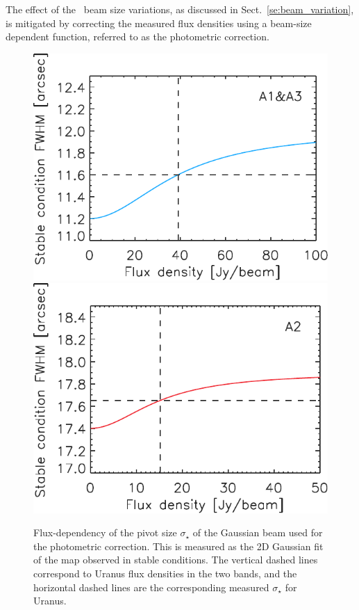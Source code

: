 %

The effect of the \afternoon\ beam size variations, as discussed
in Sect.~\ref{se:beam_variation}, is mitigated by correcting the measured flux
densities using a beam-size dependent function, referred to as the
photometric correction.

\begin{figure}[ht!]
  \begin{center}
    \includegraphics[clip=true, trim={0, -0.3cm, -0.3cm, 0}, width=0.49\linewidth]{Figures/FWHM_stable_empiric_ref_1mm.pdf}
    \includegraphics[clip=true, trim={0, -0.3cm, -0.3cm, 0}, width=0.49\linewidth]{Figures/FWHM_stable_empiric_ref_a2.pdf}
    \caption[Photometric correction pivot Gaussian
      size]{Flux-dependency of the pivot size $\sigma_\star$ of the
      Gaussian beam used for the photometric correction. This is measured as the 2D
      Gaussian fit of the map observed in stable conditions.
      The vertical dashed lines correspond to Uranus flux densities in
      the two bands, and the horizontal dashed lines are the
      corresponding measured
      $\sigma_\star$ for Uranus.}
    \label{fig:sigma_stable_vs_flux}
  \end{center}
\end{figure}

